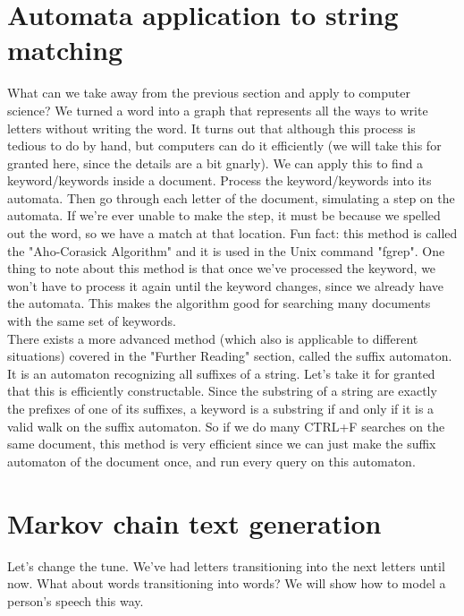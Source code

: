 \documentclass[12pt]{article}
\begin{document}
\section{Automata application to string matching}
What can we take away from the previous section and apply to computer science? We turned a word into a graph that represents all the ways to write letters without writing the word. It turns out that although this process is tedious to do by hand, but computers can do it efficiently (we will take this for granted here, since the details are a bit gnarly). We can apply this to find a keyword/keywords inside a document. Process the keyword/keywords into its automata. Then go through each letter of the document, simulating a step on the automata. If we're ever unable to make the step, it must be because we spelled out the word, so we have a match at that location. Fun fact: this method is called the "Aho-Corasick Algorithm" and it is used in the Unix command "fgrep". One thing to note about this method is that once we've processed the keyword, we won't have to process it again until the keyword changes, since we already have the automata. This makes the algorithm good for searching many documents with the same set of keywords. \\

There exists a more advanced method (which also is applicable to different situations) covered in the "Further Reading" section, called the suffix automaton. It is an automaton recognizing all suffixes of a string. Let's take it for granted that this is efficiently constructable. Since the substring of a string are exactly the prefixes of one of its suffixes, a keyword is a substring if and only if it is a valid walk on the suffix automaton. So if we do many CTRL+F searches on the same document, this method is very efficient since we can just make the suffix automaton of the document once, and run every query on this automaton.

\section{Markov chain text generation}
Let's change the tune. We've had letters transitioning into the next letters until now. What about words transitioning into words? We will show how to model a person's speech this way. \\
\end{document}
